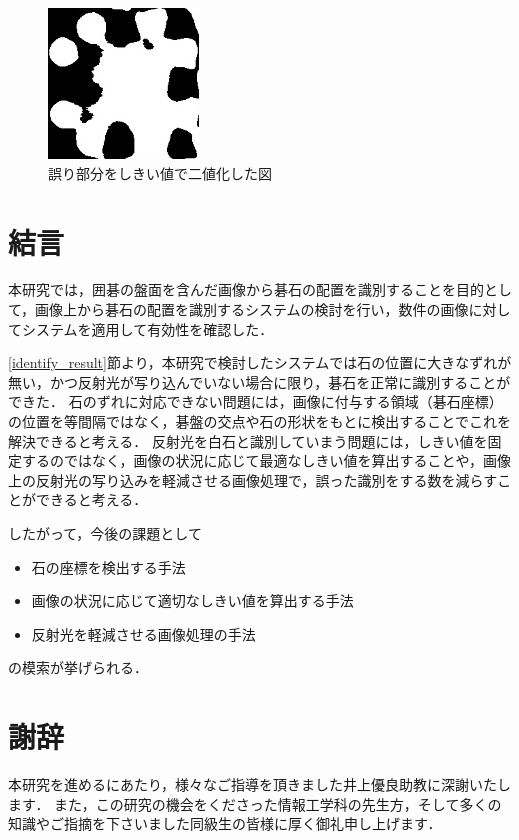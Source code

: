 \documentclass[openright]{nitocs}
\numberwithin{equation}{section}
\begin{document}
                \begin{figure}[tb] %
                    \begin{center}
                    \includegraphics[clip,width=40mm]{DSC_0098/TRIM_inRange_WHITE.jpg} 
                    \caption{誤り部分をしきい値で二値化した図}
                    \label{ex3_error_area}
                    \end{center}
                \end{figure}

    \section{結言}\label{sec:Item} %
        本研究では，囲碁の盤面を含んだ画像から碁石の配置を識別することを目的として，画像上から碁石の配置を識別するシステムの検討を行い，数件の画像に対してシステムを適用して有効性を確認した．

        \ref{identify_result}節より，本研究で検討したシステムでは石の位置に大きなずれが無い，かつ反射光が写り込んでいない場合に限り，碁石を正常に識別することができた．
        石のずれに対応できない問題には，画像に付与する領域（碁石座標）の位置を等間隔ではなく，碁盤の交点や石の形状をもとに検出することでこれを解決できると考える．
        反射光を白石と識別していまう問題には，しきい値を固定するのではなく，画像の状況に応じて最適なしきい値を算出することや，画像上の反射光の写り込みを軽減させる画像処理で，誤った識別をする数を減らすことができると考える．

        したがって，今後の課題として
        \begin{itemize}
            \item 石の座標を検出する手法
            \item 画像の状況に応じて適切なしきい値を算出する手法
            \item 反射光を軽減させる画像処理の手法
        \end{itemize}
        の模索が挙げられる．

    \section*{謝辞} %
        本研究を進めるにあたり，様々なご指導を頂きました井上優良助教に深謝いたします．
        また，この研究の機会をくださった情報工学科の先生方，そして多くの知識やご指摘を下さいました同級生の皆様に厚く御礼申し上げます．
    
\end{document}
